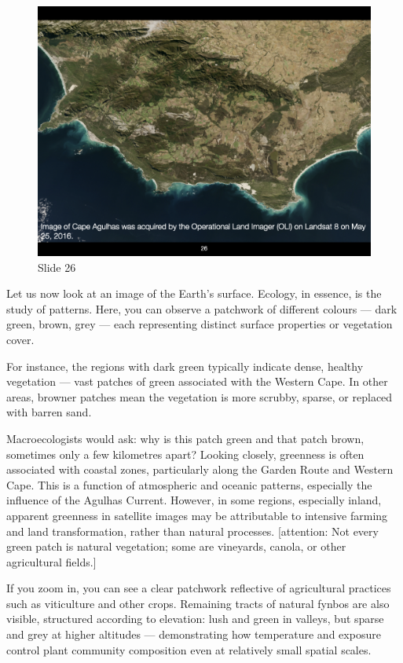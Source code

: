\documentclass[
  10pt,
]{book}
\begin{document}
\begin{figure}[ht]
\centering
\includegraphics[width=0.8\linewidth]{../images/BDC334/BDC334-026.jpeg}
\caption*{Slide 26}
\end{figure}

Let us now look at an image of the Earth's surface. Ecology, in essence,
is the study of patterns. Here, you can observe a patchwork of different
colours --- dark green, brown, grey --- each representing distinct
surface properties or vegetation cover.

For instance, the regions with dark green typically indicate dense,
healthy vegetation --- vast patches of green associated with the Western
Cape. In other areas, browner patches mean the vegetation is more
scrubby, sparse, or replaced with barren sand.

Macroecologists would ask: why is this patch green and that patch brown,
sometimes only a few kilometres apart? Looking closely, greenness is
often associated with coastal zones, particularly along the Garden Route
and Western Cape. This is a function of atmospheric and oceanic
patterns, especially the influence of the Agulhas Current. However, in
some regions, especially inland, apparent greenness in satellite images
may be attributable to intensive farming and land transformation, rather
than natural processes. {[}attention: Not every green patch is natural
vegetation; some are vineyards, canola, or other agricultural fields.{]}

If you zoom in, you can see a clear patchwork reflective of agricultural
practices such as viticulture and other crops. Remaining tracts of
natural fynbos are also visible, structured according to elevation: lush
and green in valleys, but sparse and grey at higher altitudes ---
demonstrating how temperature and exposure control plant community
composition even at relatively small spatial scales.
\end{document}
